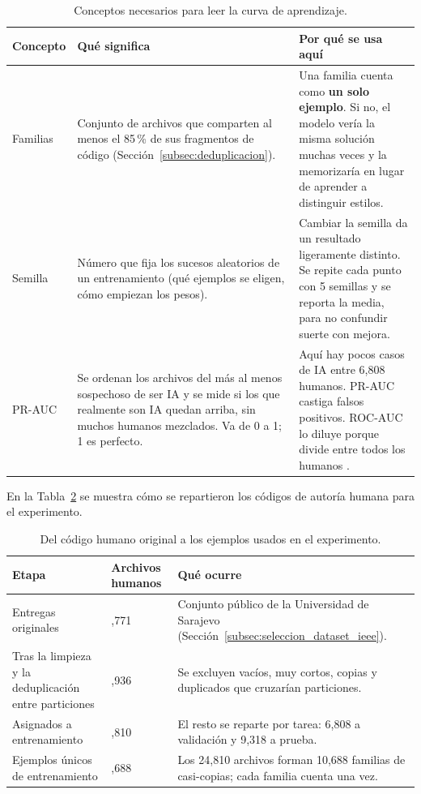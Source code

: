 \begin{table}[H]
    \centering
    \caption{Conceptos necesarios para leer la curva de aprendizaje.}
    \label{tab:conceptos_curva}
    \renewcommand{\arraystretch}{1.25}
    \begin{tabularx}{\textwidth}{|l|X|X|}
        \hline
        \textbf{Concepto} & \textbf{Qué significa} & \textbf{Por qué se usa aquí} \\ \hline
        Familias &
        Conjunto de archivos que comparten al menos el 85\,\% de sus fragmentos de código (Sección~\ref{subsec:deduplicacion}). &
        Una familia cuenta como \textbf{un solo ejemplo}. Si no, el modelo vería la misma solución muchas veces y la memorizaría en lugar de aprender a distinguir estilos. \\ \hline
        Semilla &
        Número que fija los sucesos aleatorios de un entrenamiento (qué ejemplos se eligen, cómo empiezan los pesos). &
        Cambiar la semilla da un resultado ligeramente distinto. Se repite cada punto con 5 semillas y se reporta la media, para no confundir suerte con mejora. \\ \hline
        PR-AUC &
        Se ordenan los archivos del más al menos sospechoso de ser IA y se mide si los que realmente son IA quedan arriba, sin muchos humanos mezclados. Va de 0 a 1; 1 es perfecto. &
        Aquí hay pocos casos de IA entre 6,808 humanos. PR-AUC castiga falsos positivos. ROC-AUC lo diluye porque divide entre todos los humanos \cite{McDermott2024AUROC}. \\ \hline
    \end{tabularx}
\end{table}

En la Tabla~\ref{tab:embudo_humano} se muestra cómo se repartieron los códigos de autoría humana para el experimento.

\begin{table}[H]
    \centering
    \caption{Del código humano original a los ejemplos usados en el experimento.}
    \label{tab:embudo_humano}
    \renewcommand{\arraystretch}{1.25}
    \begin{tabularx}{\textwidth}{|>{\raggedright\arraybackslash}p{}|>{\centering\arraybackslash}p{}|X|}
        \hline
        \textbf{Etapa} & \textbf{Archivos humanos} & \textbf{Qué ocurre} \\ \hline
        Entregas originales & 43,771 & Conjunto público de la Universidad de Sarajevo (Sección~\ref{subsec:seleccion_dataset_ieee}). \\ \hline
        Tras la limpieza y la deduplicación entre particiones & 40,936 & Se excluyen vacíos, muy cortos, copias y duplicados que cruzarían particiones. \\ \hline
        Asignados a entrenamiento & 24,810 & El resto se reparte por tarea: 6,808 a validación y 9,318 a prueba. \\ \hline
        Ejemplos únicos de entrenamiento & 10,688 & Los 24,810 archivos forman 10,688 familias de casi-copias; cada familia cuenta una vez. \\ \hline
    \end{tabularx}
\end{table}

